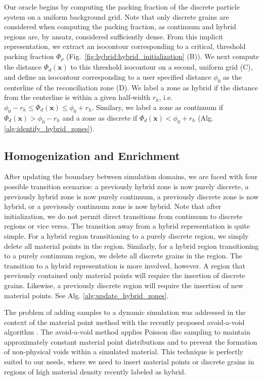 Our oracle begins by computing the packing fraction of the discrete particle system on a uniform background grid. Note
that only discrete grains are considered when computing the packing fraction, as continuum and hybrid regions are, by
ansatz, considered sufficiently dense. From this implicit representation, we extract an isocontour corresponding to a
critical, threshold packing fraction $\Phi_\rho$ (Fig.~\ref{fig:hybrid:hybrid_initialization} (B)). We next compute the distance $\Phi_d(\bm{x})$ to this threshold isocontour on a second, uniform grid (C), and define an isocontour corresponding to a user specified distance $\phi_0$ as the centerline of the reconciliation zone (D). We label a zone as hybrid if the distance from the centerline is within a given half-width $r_h$, i.e. $\phi_0 - r_h \leq \Phi_d(\bm{x}) \leq \phi_0 + r_h$. Similary, we label a zone as continuum if $\Phi_d(\bm{x}) > \phi_0 - r_h$ and a zone as discrete if $\Phi_d(\bm{x}) < \phi_0 + r_h$ (Alg. \ref{alg:identify_hybrid_zones}).

\subsection{Homogenization and Enrichment}
\label{sec:enrichment}
After updating the boundary between simulation domains, we are faced with four possible transition scenarios: a
previously hybrid zone is now purely discrete, a previously hybrid zone is now purely continuum, a previously discrete
zone is now hybrid, or a previously continuum zone is now hybrid. Note that after initialization, we do not permit
direct transitions from continuum to discrete regions or vice versa. The transition away from a hybrid representation is
quite simple. For a hybrid region transitioning to a purely discrete region, we simply delete all material points in the
region. Similarly, for a hybrid region transitioning to a purely continuum region, we delete all discrete grains in the
region. The transition to a hybrid representation is more involved, however. A region that previously contained only
material points will require the insertion of discrete grains. Likewise, a previously discrete region will require the
insertion of new material points. See Alg. \ref{alg:update_hybrid_zones}.

The problem of adding samples to a dynamic simulation was addressed in the context of the material point method with the
recently proposed avoid-a-void algorithm \cite{Yue:2015:Continuum}. The avoid-a-void method applies Poisson disc
sampling to maintain approximately constant material point distributions and to prevent the formation of non-physical
voids within a simulated material. This technique is perfectly suited to our needs, where we need to insert material
points or discrete grains in regions of high material density recently labeled as hybrid. 


